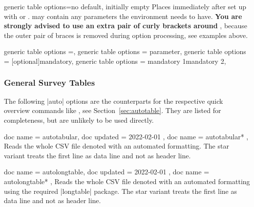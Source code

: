 \documentclass[a4paper,11pt]{ltxdoc}
\begin{document}
\begin{docCsvKey}[][doc new=2021-09-09]{generic table options}{=}{no default, initially empty}
  Places  immediately after  set up with
   or .
   may contain any parameters the environment  needs to have.
  \textbf{\color{red!50!black}You are strongly advised to use an extra pair of
  curly brackets  around }, because the outer pair of braces is
  removed during option processing, see examples above.
\begin{dispListing}
  generic table options =,
  generic table options = {{parameter}},
  generic table options = {[optional]{mandatory}},
  generic table options = {{mandatory 1}{mandatory 2}},
\end{dispListing}

\end{docCsvKey}


\clearpage
\subsubsection{General Survey Tables}\label{subsubsec:table_survey}

The following |auto| options are the counterparts for the respective quick
overview commands like , see Section~\ref{sec:autotable}.
They are listed for
completeness, but are unlikely to be used directly.

\begin{docCsvKeys}[
    doc parameter   = {=\meta{file name}},
    doc description = no default,
  ]
  {
    { doc name = autotabular, doc updated = {2022-02-01} },
    { doc name = autotabular* },
  }
  Reads the whole CSV file denoted  with an automated formatting.
  The star variant treats the first line as data line and not as header line.
\end{docCsvKeys}


\begin{docCsvKeys}[
    doc parameter   = {=\meta{file name}},
    doc description = no default,
  ]
  {
    { doc name = autolongtable, doc updated = {2022-02-01}  },
    { doc name = autolongtable* },
  }
  Reads the whole CSV file denoted  with an automated formatting
  using the required |longtable| package.
  The star variant treats the first line as data line and not as header line.
\end{docCsvKeys}
\end{document}
